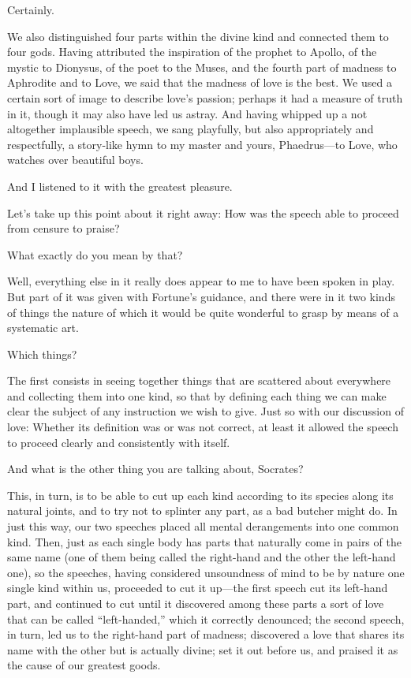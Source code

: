\sayphaedrus Certainly.

\saysocrates We also distinguished four parts within the divine kind and
connected them to four gods. Having attributed the inspiration of the
prophet to Apollo, of the mystic to Dionysus, of the poet to the Muses,
and the fourth part of madness to Aphrodite and to Love, we said that
the madness of love is the best. We used a certain sort of image to
describe love's passion; perhaps it had a measure of truth in it, though
it may also have led us astray. And having whipped up a not altogether
implausible speech, we sang playfully, but also appropriately
and respectfully, a story-like hymn to my master and yours,
Phaedrus---to Love, who watches over beautiful boys.

\sayphaedrus And I listened to it with the greatest pleasure.

\saysocrates Let's take up this point about it right away: How was the
speech able to proceed from censure to praise?

\sayphaedrus What exactly do you mean by that?

\saysocrates Well, everything else in it really does appear to me to have
been spoken in play. But part of it was given with Fortune's guidance, 
and there were in it two kinds of things the nature of which it
would be quite wonderful to grasp by means of a systematic art.

\sayphaedrus Which things?

\saysocrates The first consists in seeing together things that are
scattered about everywhere and collecting them into one kind, so that by
defining each thing we can make clear the subject of any instruction we
wish to give. Just so with our discussion of love: Whether its
definition was or was not correct, at least it allowed the speech to
proceed clearly and consistently with itself.

\sayphaedrus And what is the other thing you are talking about, Socrates?

\saysocrates This, in turn, is to be able to cut up each kind
according to its species along its natural joints, and to try not to
splinter any part, as a bad butcher might do. In just this way, our two
speeches placed all mental derangements into one common
kind. Then, just as each single body has parts that naturally come in
pairs of the same name (one of them being called the right-hand and the
other the left-hand one), so the speeches, having considered unsoundness
of mind to be by nature one single kind within us, proceeded to cut it
up---the first speech cut its left-hand part, and continued to cut until
it discovered among these parts a sort of love that can be called
“left-handed,” which it correctly denounced; the second speech, in turn,
led us to the right-hand part of madness; discovered a love that shares
its name with the other but is actually divine; set it out 
before us, and praised it as the cause of our greatest goods.

